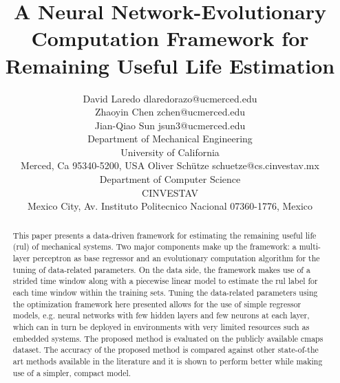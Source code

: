 \documentclass[twoside,11pt]{article}
\begin{document}
\title{A Neural Network-Evolutionary Computation Framework for Remaining Useful Life Estimation}


\glsunsetall

\author{\name David Laredo \email dlaredorazo@ucmerced.edu \\
			 \name Zhaoyin Chen \email zchen@ucmerced.edu \\
			 \name Jian-Qiao Sun \email jsun3@ucmerced.edu \\
       \addr Department of Mechanical Engineering\\
       University of California\\
       Merced, Ca 95340-5200, USA
       \AND
       \name Oliver Sch\"{u}tze \email schuetze@cs.cinvestav.mx \\
       \addr Department of Computer Science\\
       CINVESTAV\\
       Mexico City, Av. Instituto Politecnico Nacional 07360-1776, Mexico}


\maketitle

\begin{abstract}%
This paper presents a data-driven framework for estimating the remaining useful life (\gls{rul}) of mechanical systems. Two major components make up the framework: a multi-layer perceptron as base regressor and an evolutionary computation algorithm for the tuning of data-related parameters. On the data side, the framework makes use of a strided time window along with a piecewise linear model to estimate the \gls{rul} label for each time window within the training sets. Tuning the data-related parameters using the optimization framework here presented allows for the use of simple regressor models, e.g. neural networks with few hidden layers and few neurons at each layer, which can in turn be deployed in environments with very limited resources such as embedded systems. The proposed method is evaluated on the publicly available \gls{cmaps} dataset. The accuracy of the proposed method is compared against other state-of-the art methods available in the literature and it is shown to perform better while making use of a simpler, compact model.
\end{abstract}
\end{document}
